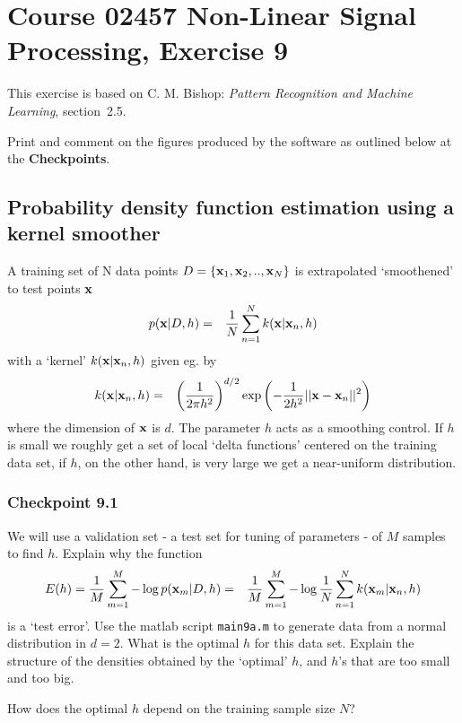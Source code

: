 \documentclass[12pt]{article}    %
\def\xb{{\bf x}}
\begin{document}
\section*{Course 02457 Non-Linear Signal Processing, Exercise 9}

This exercise is based on C. M. Bishop: {\em Pattern Recognition
and Machine Learning}, section~2.5.

Print and comment on the figures produced by the software as outlined below at the {\bf
Checkpoints}.

\subsection*{Probability density function estimation using a kernel smoother}
A training set of N data points $D=\{\xb_1,\xb_2,..,\xb_N\}$ is
extrapolated `smoothened'  to test points $\xb$
\begin{eqnarray}
p(\xb|D,h) &=& \frac{1}{N} \sum_{n=1}^{N} k(\xb|\xb_n,h) \nonumber
\end{eqnarray}
with a `kernel' $k(\xb|\xb_n,h)$ given eg. by
\begin{eqnarray}
k(\xb|\xb_n,h) &=& \left(\frac{1}{2\pi h^2}\right)^{d/2} \exp
\left(-\frac{1}{2h^2}||\xb-\xb_n||^2\right)\nonumber
\end{eqnarray}
where the dimension of $\xb$ is $d$.
The parameter $h$ acts as a smoothing control. If
$h$ is small we roughly get a set of local `delta functions' centered on the training
data set, if $h$, on the other hand, is very large we get a near-uniform distribution.

\subsubsection*{Checkpoint 9.1}
We will use a validation set  - a test set for tuning of parameters - of $M$ samples to find $h$.
Explain why the function
\begin{eqnarray}
E(h)= \frac{1}{M}\sum_{m=1}^{M} -\log p(\xb_m|D,h) &=& \frac{1}{M}\sum_{m=1}^{M} -\log \frac{1}{N} \sum_{n=1}^{N} k(\xb_m|\xb_n,h) \nonumber
\end{eqnarray}
is a `test error'. Use the matlab script {\tt main9a.m} to generate data from a normal distribution
in $d=2$. What is the optimal $h$ for this data set.
Explain the structure of the densities obtained by the `optimal' $h$,
and $h$'s that are too small and too big.

How does the optimal $h$ depend on the training sample size $N$?
\end{document}
